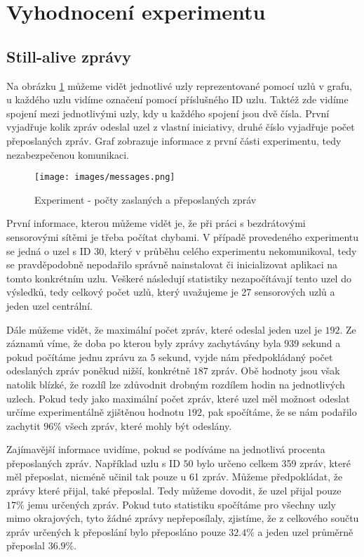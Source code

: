 \documentclass[11pt,final,twoside]{fithesis2}
\begin{document}
\section{Vyhodnocení experimentu}

\subsection{Still-alive zprávy} \label{sub:alive}

Na obrázku \ref{img:msgs} můžeme vidět jednotlivé uzly reprezentované pomocí uzlů v grafu, u každého uzlu vidíme označení pomocí příslušného ID uzlu. Taktéž zde vidíme spojení mezi jednotlivými uzly, kdy u 
každého spojení jsou dvě čísla. První vyjadřuje kolik zpráv odeslal uzel z vlastní iniciativy, druhé číslo vyjadřuje počet přeposlaných zpráv. Graf zobrazuje informace z první části experimentu, tedy
nezabezpečenou komunikaci. 

\begin{figure}[h]
     \centering
     \texttt{[image: images/messages.png]}
     \caption{Experiment - počty zaslaných a přeposlaných zpráv}
     \label{img:msgs}
\end{figure}


První informace, kterou můžeme vidět je, že při práci s bezdrátovými sensorovými sítěmi je třeba počítat chybami. V případě provedeného experimentu se jedná o uzel s ID 30, který v průběhu celého experimentu 
nekomunikoval, tedy se pravděpodobně nepodařilo správně nainstalovat či inicializovat aplikaci na tomto konkrétním uzlu. Veškeré následují statistiky nezapočítávají tento uzel do výsledků, tedy celkový počet 
uzlů, který uvažujeme je 27 sensorových uzlů a jeden uzel centrální. 

Dále můžeme vidět, že maximální počet zpráv, které odeslal jeden uzel je $192$. Ze záznamů víme, že doba po kterou byly zprávy zachytávány  byla $939$ sekund a pokud počítáme jednu 
zprávu za $5$ sekund, vyjde nám předpokládaný počet odeslaných zpráv poněkud nižší, konkrétně $187$ zpráv. Obě hodnoty jsou však natolik blízké, že rozdíl lze zdůvodnit drobným rozdílem hodin na jednotlivých 
uzlech. Pokud tedy jako maximální počet zpráv, které uzel měl možnost odeslat určíme experimentálně zjištěnou hodnotu $192$, pak spočítáme, že se nám podařilo zachytit $96\%$ všech zpráv, 
které mohly být odeslány.

Zajímavější informace uvidíme, pokud se podíváme na jednotlivá procenta přeposlaných zpráv. Například uzlu s ID $50$ bylo určeno celkem 359 zpráv, které měl přeposlat, nicméně učinil tak pouze u 61 zpráv. 
Můžeme předpokládat, že zprávy které přijal, také přeposlal. Tedy můžeme dovodit, že uzel přijal pouze $17\%$ jemu určených zpráv. Pokud tuto statistiku spočítáme pro všechny uzly mimo okrajových, tyto žádné 
zprávy nepřeposílaly, zjistíme, že z celkového součtu zpráv určených k přeposlání bylo přeposláno pouze $32.4\%$ a jeden uzel průměrně přeposlal $36.9\%$. 
\end{document}

